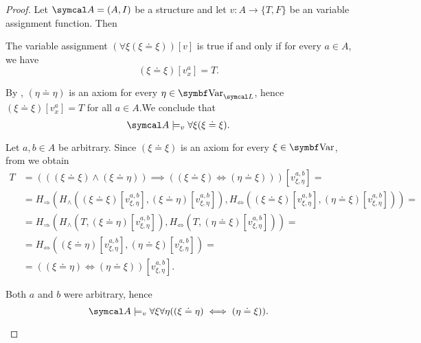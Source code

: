 \begin{proof}
  Let \( \Cal{A} = (A, I) \) be a structure and let \( v: A \to \{ T, F \} \) be an variable assignment function. Then

  \begin{description}
     The variable assignment \( (\forall \xi (\xi \doteq \xi))[v] \) is true if and only if for every \( a \in A \), we have
    \begin{equation*}
      (\xi \doteq \xi)[v_x^a] = T.
    \end{equation*}

    By , \( (\eta \doteq \eta) \) is an axiom for every \( \eta \in \Cat{Var}_{\Cal{L}} \), hence \mbox{\( (\xi \doteq \xi)[v_x^a] = T \)} for all \( a \in A \).We conclude that
    \begin{equation*}
      \Cal{A} \models_v \forall \xi (\xi \doteq \xi).
    \end{equation*}

     Let \( a, b \in A \) be arbitrary. Since \( (\xi \doteq \xi) \) is an axiom for every \( \xi \in \Cat{Var} \), from  we obtain
    \begin{align*}
      T &=
      (((\xi \doteq \xi) \land (\xi \doteq \eta)) \implies ((\xi \doteq \xi) \iff (\eta \doteq \xi)))[v_{\xi,\eta}^{a,b}]
      = \\ &=
      H_\Rightarrow(H_\land((\xi \doteq \xi)[v_{\xi,\eta}^{a,b}], (\xi \doteq \eta)[v_{\xi,\eta}^{a,b}]), H_\Leftrightarrow((\xi \doteq \xi)[v_{\xi,\eta}^{a,b}], (\eta \doteq \xi)[v_{\xi,\eta}^{a,b}]))
      = \\ &=
      H_\Rightarrow(H_\land(T, (\xi \doteq \eta)[v_{\xi,\eta}^{a,b}]), H_\Leftrightarrow(T, (\eta \doteq \xi)[v_{\xi,\eta}^{a,b}]))
      = \\ &=
      H_\Leftrightarrow((\xi \doteq \eta)[v_{\xi,\eta}^{a,b}], (\eta \doteq \xi)[v_{\xi,\eta}^{a,b}])
      = \\ &=
      ((\xi \doteq \eta) \iff (\eta \doteq \xi))[v_{\xi,\eta}^{a,b}].
    \end{align*}

    Both \( a \) and \( b \) were arbitrary, hence
    \begin{equation*}
      \Cal{A} \models_v \forall \xi \forall \eta ((\xi \doteq \eta) \iff (\eta \doteq \xi)).
    \end{equation*}


\end{description}
\end{proof}
